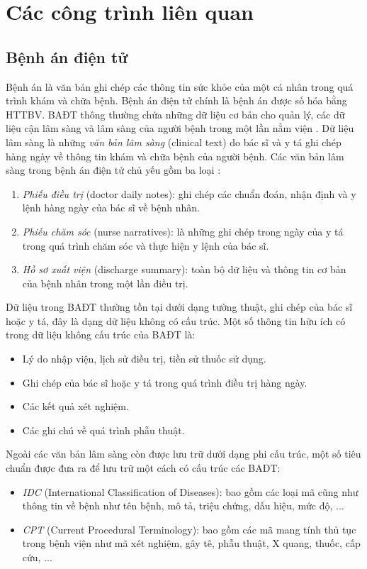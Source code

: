\chapter{Các công trình liên quan}
\section{Bệnh án điện tử}
Bệnh án là văn bản ghi chép các thông tin sức khỏe của một cá nhân trong quá trình khám và chữa bệnh. Bệnh án điện tử chính là bệnh án được số hóa bằng HTTBV. BAĐT thông thường chứa những dữ liệu cơ bản cho quản lý, các dữ liệu cận lâm sàng và lâm sàng của người bệnh trong một lần nằm viện \cite{HoTuBao2015}. Dữ liệu lâm sàng là những \textit{văn bản lâm sàng} (clinical text) do bác sĩ và y tá ghi chép hàng ngày về thông tin khám và chữa bệnh của người bệnh. Các văn bản lâm sàng trong bệnh án điện tử chủ yếu gồm ba loại \cite{HoTuBao2015}:

\begin{enumerate}
\item \emph{Phiếu điều trị} (doctor daily notes): ghi chép các chuẩn đoán, nhận định và y lệnh hàng ngày của bác sĩ về bệnh nhân.
\item \emph{Phiếu chăm sóc} (nurse narratives): là những ghi chép trong ngày của y tá trong quá trình chăm sóc và thực hiện y lệnh của bác sĩ.
\item \emph{Hồ sơ xuất viện} (discharge summary): toàn bộ dữ liệu và thông tin cơ bản của bệnh nhân trong một lần điều trị.
\end{enumerate}

Dữ liệu trong BAĐT thường tồn tại dưới dạng tường thuật, ghi chép của bác sĩ hoặc y tá, đây là dạng dữ liệu không có cấu trúc. Một số thông tin hữu ích có trong dữ liệu không cấu trúc của BAĐT là:

\begin{itemize}
\item Lý do nhập viện, lịch sử điều trị, tiền sử thuốc sử dụng.
\item Ghi chép của bác sĩ hoặc y tá trong quá trình điều trị hàng ngày.
\item Các kết quả xét nghiệm.
\item Các ghi chú về quá trình phẫu thuật.
\end{itemize}

Ngoài các văn bản lâm sàng còn được lưu trữ dưới dạng phi cấu trúc, một số tiêu chuẩn được đưa ra để lưu trữ một cách có cấu trúc các BAĐT:

\begin{itemize}
\item \emph{IDC} (International Classification of Diseases): bao gồm các loại mã cũng như thông tin về bệnh như tên bệnh, mô tả, triệu chứng, dấu hiệu, mức độ, ...
\item \textit{CPT} (Current Procedural Terminology): bao gồm các mã mang tính thủ tục trong bệnh viện như mã xét nghiệm, gây tê, phẫu thuật, X quang, thuốc, cấp cứu, ...
\end{itemize}

